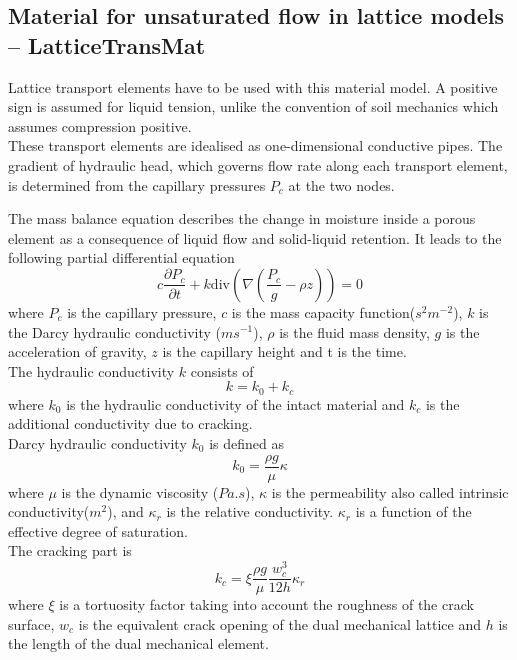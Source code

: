 \documentclass[a4paper]{article}
\begin{document}
\subsection{Material for unsaturated flow in lattice models -- LatticeTransMat}

\label{latticetransmat}
Lattice transport elements have to be used with this material model. A positive sign is assumed for liquid tension, unlike the convention of soil mechanics which assumes compression positive.\\

These transport elements are idealised as one-dimensional conductive pipes. The gradient of hydraulic head, which governs flow rate along each transport element, is determined from the capillary pressures $P_{c}$ at the two nodes.

The mass balance equation describes the change in moisture inside a porous element as a consequence of liquid flow and solid-liquid retention. It leads to the following partial differential equation
\begin{equation}\label{latticetransmat1}
c\frac{\partial P_{c}}{\partial t} + k\mbox{div}(\nabla(\frac{P_{c}}{g}-\rho z)) =0
\end{equation}
where $P_{c}$ is the capillary pressure, $c$ is the mass capacity function($s^{2}m^{-2}$), $k$ is the Darcy hydraulic conductivity ($ms^{-1}$), $\rho$ is the fluid mass density, $g$ is the acceleration of gravity, $z$ is the capillary height and t is the time.\\

The hydraulic conductivity $k$ consists of
\begin{equation}\label{latticetransmat11}
k=k_{0} + k_{c}
\end{equation}
where $k_{0} $ is the hydraulic conductivity of the intact material and $k_{c} $ is the additional conductivity due to cracking.\\

Darcy hydraulic conductivity $k_{0}$ is defined as 
\begin{equation}\label{latticetransmat12}
k_{0}=\frac{\rho g}{\mu}\kappa
\end{equation}
where $\mu$ is the dynamic viscosity ($Pa.s$), $\kappa$ is the permeability also called intrinsic conductivity($m^{2}$), and $\kappa_{r}$ is the relative conductivity. $\kappa_{r}$ is a function of the effective degree of saturation.\\

The cracking part is
\begin{equation}\label{latticetransmat13}
k_{c}=\xi\frac{\rho g}{\mu}\frac{w^{3}_{c}}{12h} \kappa_{r}
\end{equation}
where $\xi$ is a tortuosity factor taking into account the roughness of the crack surface, $w_{c}$ is the equivalent crack opening of the dual mechanical lattice and $h$ is the length of the dual mechanical element.
\end{document}
